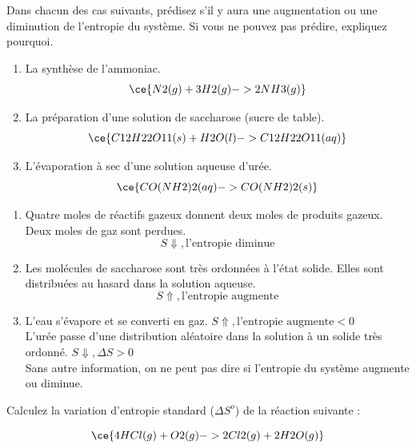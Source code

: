 \documentclass[
  11pt,
  a4paper,
  openany]{book}
\providecommand{\tightlist}{%
  \setlength{\itemsep}{0pt}\setlength{\parskip}{0pt}}
\begin{document}
\begin{Exercise}

Dans chacun des cas suivants, prédisez s'il y aura une augmentation ou une diminution de l'entropie du système. Si vous ne pouvez pas prédire, expliquez pourquoi.

\begin{enumerate}
\def\labelenumi{\alph{enumi}.}
\tightlist
\item
  La synthèse de l'ammoniac.\\
  \[ \ce{N2(g) + 3 H2(g) -> 2 NH3(g)} \]
\item
  La préparation d'une solution de saccharose (sucre de table).\\
  \[ \ce{C12H22O11(s) + H2O(l) -> C12H22O11(aq)} \]
\item
  L'évaporation à sec d'une solution aqueuse d'urée.
  \[ \ce{CO(NH2)2(aq) -> CO(NH2)2(s)} \]
\end{enumerate}

\end{Exercise}

\begin{Answer}

\begin{enumerate}
\def\labelenumi{\alph{enumi}.}
\tightlist
\item
  Quatre moles de réactifs gazeux donnent deux moles de produits gazeux. Deux moles de gaz sont perdues.\\
  \[ S \Downarrow, \text{l'entropie diminue} \]
\item
  Les molécules de saccharose sont très ordonnées à l'état solide. Elles sont distribuées au hasard dans la solution aqueuse.\\
  \[ S \Uparrow, \text{l'entropie augmente} \]
\item
  L'eau s'évapore et se converti en gaz. \(S \Uparrow, \text{l'entropie augmente} < 0\)\\
  L'urée passe d'une distribution aléatoire dans la solution à un solide très ordonné. \(S \Downarrow, \Delta S > 0\)\\
  Sans autre information, on ne peut pas dire si l'entropie du système augmente ou diminue.
\end{enumerate}

\end{Answer}

\clearpage

\begin{Exercise}
Calculez la variation d'entropie standard (\(\Delta S^o\)) de la réaction suivante :

\[ \ce{4 HCl(g) + O2(g) -> 2 Cl2(g) + 2 H2O(g)} \]

\end{Exercise}
\end{document}
